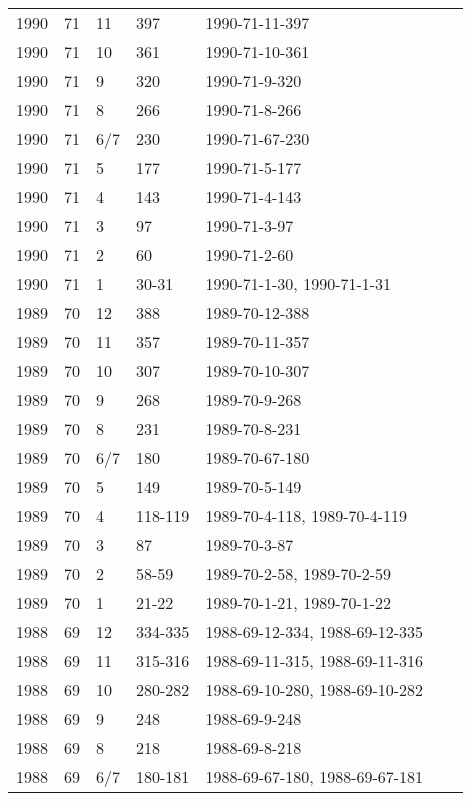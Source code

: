 \begin{longtable}{ |l|l|l|l|p{2.7cm}|l|p{2cm}| }
 1990 & 71 &    11 &    397  & 1990-71-11-397 &  & \\
 1990 & 71 &    10 &    361  & 1990-71-10-361 &  & \\
 1990 & 71 &     9 &    320  & 1990-71-9-320  &  & \\
 1990 & 71 &     8 &    266  & 1990-71-8-266  &  & \\
 1990 & 71 &   6/7 &    230  & 1990-71-67-230 &  & \\
 1990 & 71 &     5 &    177  & 1990-71-5-177  &   & \\
 1990 & 71 &     4 &    143  & 1990-71-4-143  &  & \\
 1990 & 71 &     3 &   97    & 1990-71-3-97   &  & \\
 1990 & 71 &     2 &  60     & 1990-71-2-60   &  & \\
 1990 & 71 &     1 &  30-31  & 1990-71-1-30, 1990-71-1-31               &  & \\
 1989 & 70 &    12 &    388  & 1989-70-12-388 &   & \\
 1989 & 70 &    11 &    357  & 1989-70-11-357 &  & \\
 1989 & 70 &    10 &  307    & 1989-70-10-307 &  & \\
 1989 & 70 &     9 &    268  & 1989-70-9-268  &  & \\
 1989 & 70 &     8 &   231   &  1989-70-8-231 &  & \\
 1989 & 70 &   6/7 &   180   & 1989-70-67-180 &  & \\
 1989 & 70 &     5 & 149     & 1989-70-5-149  &  & \\
 1989 & 70 &     4 & 118-119 & 1989-70-4-118, 1989-70-4-119 &  & \\
 1989 & 70 &     3 &    87   & 1989-70-3-87   &  & \\
 1989 & 70 &     2 &  58-59  & 1989-70-2-58, 1989-70-2-59 &  & \\
 1989 & 70 &     1 & 21-22   & 1989-70-1-21, 1989-70-1-22 &  & \\
 1988 & 69 &    12 & 334-335 & 1988-69-12-334, 1988-69-12-335               &  & \\
 1988 & 69 &    11 & 315-316 & 1988-69-11-315, 1988-69-11-316 &  & \\
 1988 & 69 &    10 & 280-282 & 1988-69-10-280, 1988-69-10-282 &  & \\
 1988 & 69 &     9 &    248  & 1988-69-9-248  &  & \\
 1988 & 69 &     8 &    218  & 1988-69-8-218  &  & \\
 1988 & 69 &   6/7 & 180-181 & 1988-69-67-180, 1988-69-67-181 &  & \\

\end{longtable}
